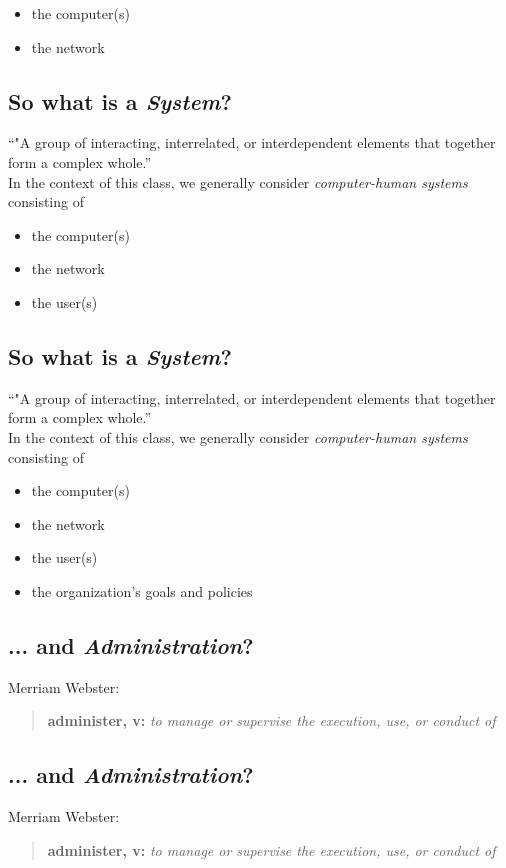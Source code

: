 \documentclass[xga]{xdvislides}
\begin{document}
\begin{itemize}
	\item the computer(s)
	\item the network
\end{itemize}

\subsection{So what is a {\em System}?}
``"A group of interacting, interrelated, or interdependent elements that
together form a complex whole.''
\\

In the context of this class, we generally consider {\em computer-human
systems} consisting of

\begin{itemize}
	\item the computer(s)
	\item the network
	\item the user(s)
\end{itemize}

\subsection{So what is a {\em System}?}
``"A group of interacting, interrelated, or interdependent elements that
together form a complex whole.''
\\

In the context of this class, we generally consider {\em computer-human
systems} consisting of

\begin{itemize}
	\item the computer(s)
	\item the network
	\item the user(s)
	\item the organization's goals and policies
\end{itemize}

\subsection{... and {\em Administration}?}
Merriam Webster:
\begin{quote}
	{\bf administer, v:} {\em to manage or supervise the execution, use, or conduct of} \\
\end{quote}


\subsection{... and {\em Administration}?}
Merriam Webster:
\begin{quote}
	{\bf administer, v:} {\em to manage or supervise the execution, use, or conduct of} \\
\end{quote}
\end{document}
